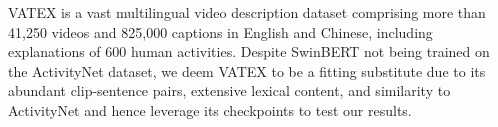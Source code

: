  VATEX is a vast multilingual video description dataset comprising more than 41,250 videos and 825,000 captions in English and Chinese, including explanations of 600 human activities. Despite SwinBERT not being trained on the ActivityNet dataset, we deem VATEX to be a fitting substitute due to its abundant clip-sentence pairs, extensive lexical content, and similarity to ActivityNet and hence leverage its checkpoints to test our results.